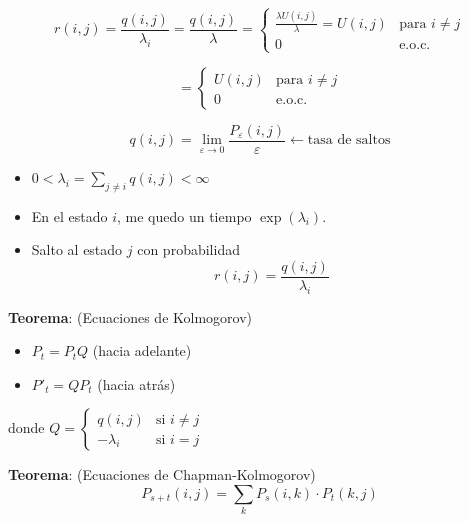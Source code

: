 \documentclass[12pt,a4paper]{article}
\newcommand{\teorema}[1]{%
\begin{teoremabox}
\textbf{Teorema}: #1
\end{teoremabox}
}
\begin{document}
\begin{equation*}
r(i,j) = \frac{q(i,j)}{\lambda_i} = \frac{q(i,j)}{\lambda} = \begin{cases}
\frac{\lambda U(i,j)}{\lambda} = U(i,j) & \text{para } i \neq j \\
0 & \text{e.o.c.}
\end{cases}
\end{equation*}

\begin{equation*}
= \begin{cases}
U(i,j) & \text{para } i \neq j \\
0 & \text{e.o.c.}
\end{cases}
\end{equation*}


\begin{equation*}
q(i,j) = \lim_{\varepsilon \to 0} \frac{P_\varepsilon(i,j)}{\varepsilon} \leftarrow \text{tasa de saltos}
\end{equation*}

\begin{itemize}
    \item $0 < \lambda_i = \sum_{j \neq i} q(i,j) < \infty$
    \item En el estado $i$, me quedo un tiempo $\exp(\lambda_i)$.
    \item Salto al estado $j$ con probabilidad
    \begin{equation*}
    r(i,j) = \frac{q(i,j)}{\lambda_i}
    \end{equation*}
\end{itemize}


\teorema{(Ecuaciones de Kolmogorov)
\begin{itemize}
    \item $P_t = P_t Q$ \quad (hacia adelante)
    \item $P'_t = Q P_t$ \quad (hacia atrás)
\end{itemize}
donde $Q = \begin{cases}
q(i,j) & \text{si } i \neq j \\
-\lambda_i & \text{si } i = j
\end{cases}$
}


\teorema{(Ecuaciones de Chapman-Kolmogorov)
\begin{equation*}
P_{s+t}(i,j) = \sum_{k} P_s(i,k) \cdot P_t(k,j)
\end{equation*}
}
\end{document}
